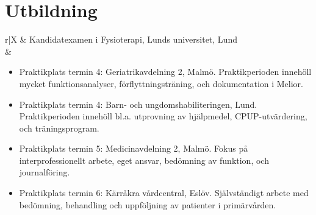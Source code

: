 \documentclass[11pt,a4paper]{article}
\begin{document}
\section{Utbildning}
\hspace{-4pt}
\begin{tabularx}{\textwidth}{r|X}	
	& Kandidatexamen i Fysioterapi, Lunds universitet, Lund\\
	&\footnotesize{\vspace{-5pt}
		 \begin{itemize}[leftmargin=10pt, topsep=-12.5pt]

		\item Praktikplats termin 4: Geriatrikavdelning 2, Malmö. Praktikperioden innehöll mycket funktionsanalyser, förflyttningsträning, och dokumentation i Melior. 
		
		\item Praktikplats termin 4: Barn- och ungdomshabiliteringen, Lund. Praktikperioden innehöll bl.a. utprovning av hjälpmedel, CPUP-utvärdering, och träningsprogram.
		
		\item Praktikplats termin 5: Medicinavdelning 2, Malmö.
		Fokus på interprofessionellt arbete, eget ansvar, bedömning av funktion, och journalföring.
		
		\item Praktikplats termin 6: Kärråkra vårdcentral, Eslöv. Självständigt arbete med bedömning, behandling och uppföljning av patienter i primärvården.
		
		\end{itemize}\vspace{-30pt} 
	}\\
	 \\
\end{tabularx}

\end{document}
